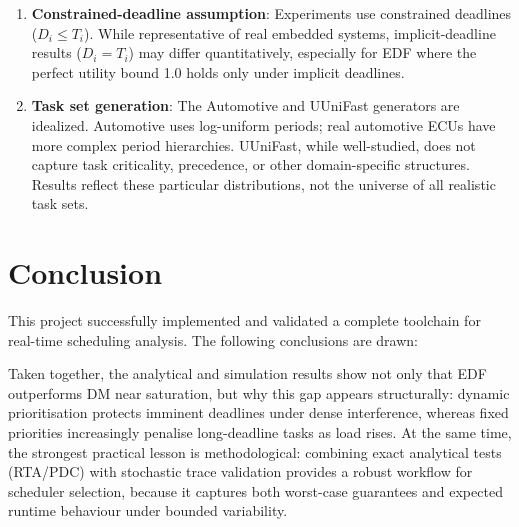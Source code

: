 \documentclass[12pt,a4paper]{article}
\begin{document}
\begin{enumerate}
    \item \textbf{Constrained-deadline assumption}: Experiments use constrained deadlines (\(D_i \leq T_i\)). While representative of real embedded systems, implicit-deadline results (\(D_i = T_i\)) may differ quantitatively, especially for EDF where the perfect utility bound 1.0 holds only under implicit deadlines.\vspace{0.2cm}

    \item \textbf{Task set generation}: The Automotive and UUniFast generators are idealized. Automotive uses log-uniform periods; real automotive ECUs have more complex period hierarchies. UUniFast, while well-studied, does not capture task criticality, precedence, or other domain-specific structures. Results reflect these particular distributions, not the universe of all realistic task sets.
\end{enumerate}

\section{Conclusion}
\label{sec:conclusion}

This project successfully implemented and validated a complete toolchain for real-time scheduling analysis. The following conclusions are drawn:

Taken together, the analytical and simulation results show not only that EDF outperforms DM near saturation, but why this gap appears structurally: dynamic prioritisation protects imminent deadlines under dense interference, whereas fixed priorities increasingly penalise long-deadline tasks as load rises. At the same time, the strongest practical lesson is methodological: combining exact analytical tests (RTA/PDC) with stochastic trace validation provides a robust workflow for scheduler selection, because it captures both worst-case guarantees and expected runtime behaviour under bounded variability.
\end{document}
